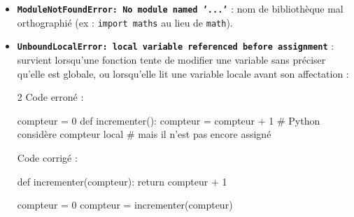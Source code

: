 \documentclass[11pt,a4paper]{article}
\begin{document}
\begin{tcolorbox}[left=0cm,title=\bf{\faBug \; 5. Erreurs de nom et portée (NameError, UnboundLocalError)},colbacktitle=cfond]
\begin{itemize}
	\item[\textbullet] \textbf{\texttt{ModuleNotFoundError: No module named '...'}} : nom de bibliothèque mal orthographié (ex : \texttt{import maths} au lieu de \texttt{math}).

	\item[\textbullet] \textbf{\texttt{UnboundLocalError: local variable referenced before assignment}} : survient lorsqu'une fonction tente de modifier une variable sans préciser qu'elle est globale, ou lorsqu'elle lit une variable locale avant son affectation :
	\begin{multicols}{2}
		\textcolor{BrickRed}{\faTimesCircle \; Code erroné :}
		\begin{python}
compteur = 0
def incrementer():
    compteur = compteur + 1
# Python considère compteur local
# mais il n'est pas encore assigné
		\end{python}
		\textcolor{OliveGreen}{\faCheckCircle \; Code corrigé :}
		\begin{python}
def incrementer(compteur):
    return compteur + 1

compteur = 0
compteur = incrementer(compteur)
		\end{python}
	\end{multicols}
\end{itemize}
\end{tcolorbox}
\end{document}
